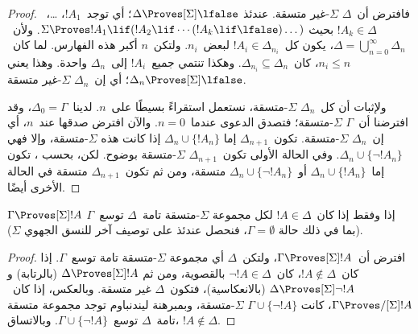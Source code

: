 \documentclass[../../../include/open-logic-section]{subfiles}
\begin{document}
\begin{proof}
فافترض أن~$\Delta$ $\Sigma$-غير متسقة. عندئذ
$\Delta \Proves[\Sigma] \lfalse$؛ أي توجد~$!A_1$، \dots،~$!A_k
\in \Delta$ بحيث
$\Sigma \Proves !A_1 \lif (!A_2 \lif \cdots (!A_k \lif
\lfalse)\dots)$. ولأن~$\Delta = \bigcup_{n=0}^\infty \Delta_n$،
يكون كل~$!A_i \in \Delta_{n_i}$ لبعض~$n_i$. ولتكن~$n$ أكبر هذه
الفهارس. لما كان~$n_i \le n$، كان~$\Delta_{n_i} \subseteq \Delta_n$.
وهكذا تنتمي جميع~$!A_i$ إلى~$\Delta_n$ واحدة. وهذا يعني
$\Delta_n \Proves[\Sigma] \lfalse$؛ أي إن~$\Delta_n$
$\Sigma$-غير متسقة.

ولإثبات أن كل~$\Delta_n$ $\Sigma$-متسقة، نستعمل استقراءً بسيطًا
على~$n$. لدينا~$\Delta_0 = \Gamma$، وقد افترضنا أن~$\Gamma$
$\Sigma$-متسقة؛ فتصدق الدعوى عندما~$n = 0$. والآن افترض صدقها عند~$n$،
أي إن~$\Delta_n$ $\Sigma$-متسقة. تكون~$\Delta_{n+1}$ إما
$\Delta_n \cup \{!A_n\}$ إذا كانت هذه $\Sigma$-متسقة، وإلا فهي
$\Delta_n \cup \{\lnot!A_n\}$. وفي الحالة الأولى تكون~$\Delta_{n+1}$
$\Sigma$-متسقة بوضوح. لكن، بحسب
،
تكون إما~$\Delta_n \cup \{!A_n\}$ أو~$\Delta_n \cup \{\lnot!A_n\}$
متسقة، ومن ثم تكون~$\Delta_{n+1}$ متسقة في الحالة الأخرى أيضًا.
\end{proof}

\begin{cor}
  $\Gamma \Proves[\Sigma] !A$ إذا وفقط إذا كان~$!A \in \Delta$ لكل
  مجموعة $\Sigma$-متسقة تامة~$\Delta$ توسع~$\Gamma$ (بما في ذلك حالة
  $\Gamma = \emptyset$، فنحصل عندئذ على توصيف آخر للنسق الجهوي
  $\Sigma$).
\end{cor}

\begin{proof}
  افترض أن~$\Gamma \Proves[\Sigma] !A$، ولتكن~$\Delta$ أي مجموعة
  $\Sigma$-متسقة تامة توسع~$\Gamma$. إذا كان~$!A \notin \Delta$،
  كان~$\lnot!A \in \Delta$ بالقصوية، ومن ثم
  $\Delta \Proves[\Sigma] !A$ (بالرتابة) و
  $\Delta \Proves[\Sigma] \lnot!A$ (بالانعكاسية)، فتكون~$\Delta$ غير
  متسقة. وبالعكس، إذا كان~$\Gamma \Proves/[\Sigma] !A$، كانت
  $\Gamma \cup \{\lnot!A\}$ $\Sigma$-متسقة، وبمبرهنة ليندنباوم توجد
  مجموعة متسقة تامة~$\Delta$ توسع~$\Gamma \cup \{\lnot!A\}$. وبالاتساق،
  $!A \notin \Delta$.
\end{proof}
\end{document}
